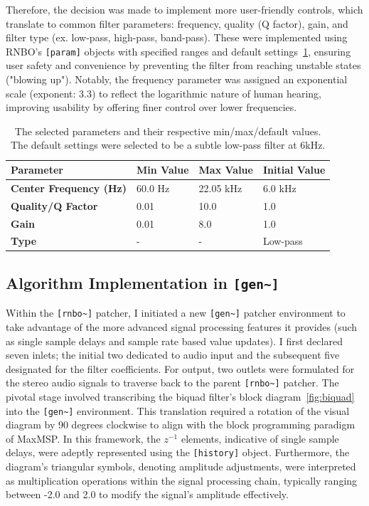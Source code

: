 \documentclass[10pt,twocolumn]{article}
\begin{document}
Therefore, the decision was made to implement more user-friendly controls, which translate to common filter parameters: frequency, quality (Q factor), gain, and filter type (ex. low-pass, high-pass, band-pass). These were implemented using RNBO’s \verb|[param]| objects with specified ranges and default settings~\ref{tbl:parameters}, ensuring user safety and convenience by preventing the filter from reaching unstable states ("blowing up"). Notably, the frequency parameter was assigned an exponential scale (exponent: 3.3) to reflect the logarithmic nature of human hearing, improving usability by offering finer control over lower frequencies.

\begin{table}
    \footnotesize
    \begin{tabular}{|l|l|l|l|}
        \hline
        \textbf{Parameter}       &  \textbf{Min Value} & \textbf{Max Value}  &  \textbf{Initial Value}          \\
        \hline
        \textbf{Center Frequency (Hz)}  &  60.0 Hz         & 22.05 kHz &  6.0 kHz  \\
        \textbf{Quality/Q Factor}     &  0.01                & 10.0 &  1.0              \\
        \textbf{Gain}                  &  0.01         & 8.0 &  1.0     \\
        \textbf{Type}                  &  - &  -                &  Low-pass                \\
        \hline
    \end{tabular}
    \caption{The selected parameters and their respective min/max/default values. The default settings were selected to be a subtle low-pass filter at 6kHz.}
    \label{tbl:parameters}
\end{table}

\subsection{Algorithm Implementation in \texttt{[gen\textasciitilde]}}
Within the \verb|[rnbo~]| patcher, I initiated a new \verb|[gen~]| patcher environment to take advantage of the more advanced signal processing features it provides (such as single sample delays and sample rate based value updates). I first declared seven inlets; the initial two dedicated to audio input and the subsequent five designated for the filter coefficients. For output, two outlets were formulated for the stereo audio signals to traverse back to the parent \verb|[rnbo~]| patcher. The pivotal stage involved transcribing the biquad filter's block diagram~\ref{fig:biquad} into the \verb|[gen~]| environment. This translation required a rotation of the visual diagram by 90 degrees clockwise to align with the block programming paradigm of MaxMSP. In this framework, the \(z^{-1}\) elements, indicative of single sample delays, were adeptly represented using the \texttt{[history]} object. Furthermore, the diagram's triangular symbols, denoting amplitude adjustments, were interpreted as multiplication operations within the signal processing chain, typically ranging between -2.0 and 2.0 to modify the signal's amplitude effectively.
\end{document}
